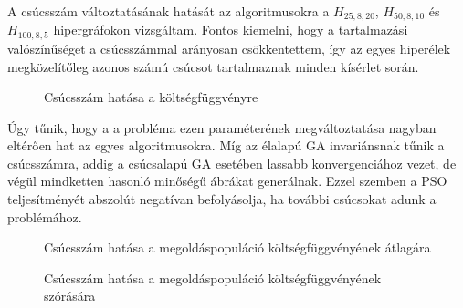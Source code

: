 A csúcsszám változtatásának hatását az algoritmusokra a $H_{25,8,20}$, $H_{50,8,10}$ és $H_{100,8,5}$ hipergráfokon vizsgáltam. Fontos kiemelni, hogy a tartalmazási valószínűséget a csúcsszámmal arányosan csökkentettem, így az egyes hiperélek megközelítőleg azonos számú csúcsot tartalmaznak minden kísérlet során.

\begin{figure}[H]
	\centering
	\hspace{5pt}
	\hspace{5pt}
	\caption{Csúcsszám hatása a költségfüggvényre}
	\label{fig:node_size_cost}
\end{figure}

Úgy tűnik, hogy a a probléma ezen paraméterének megváltoztatása nagyban eltérően hat az egyes algoritmusokra. Míg az élalapú GA invariánsnak tűnik a csúcsszámra, addig a csúcsalapú GA esetében lassabb konvergenciához vezet, de végül mindketten hasonló minőségű ábrákat generálnak. Ezzel szemben a PSO teljesítményét abszolút negatívan befolyásolja, ha további csúcsokat adunk a problémához.

\begin{figure}[H]
	\centering
	\hspace{5pt}
	\hspace{5pt}
	\caption{Csúcsszám hatása a megoldáspopuláció költségfüggvényének átlagára}
	\label{fig:node_size_cost_mean}
\end{figure}

\begin{figure}[H]
	\centering
	\hspace{5pt}
	\hspace{5pt}
	\caption{Csúcsszám hatása a megoldáspopuláció költségfüggvényének szórására}
	\label{fig:node_size_cost_std}
\end{figure}


